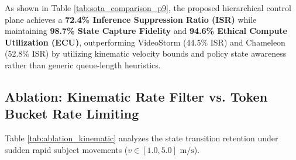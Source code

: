 \documentclass[conference]{IEEEtran}
\begin{document}
\begin{table}[htbp]
\centering
\caption{System-Level Performance Comparison Against SOTA Video Analytics Baselines}
\label{tab:sota_comparison_p9}
\begin{center}
\end{center}
\end{table}

As shown in Table \ref{tab:sota_comparison_p9}, the proposed hierarchical control plane achieves a \textbf{72.4\% Inference Suppression Ratio (ISR)} while maintaining \textbf{98.7\% State Capture Fidelity} and \textbf{94.6\% Ethical Compute Utilization (ECU)}, outperforming VideoStorm (44.5\% ISR) and Chameleon (52.8\% ISR) by utilizing kinematic velocity bounds and policy state awareness rather than generic queue-length heuristics.

\subsection{Ablation: Kinematic Rate Filter vs. Token Bucket Rate Limiting}
Table \ref{tab:ablation_kinematic} analyzes the state transition retention under sudden rapid subject movements ($v \in [1.0, 5.0]\text{ m/s}$).
\end{document}
